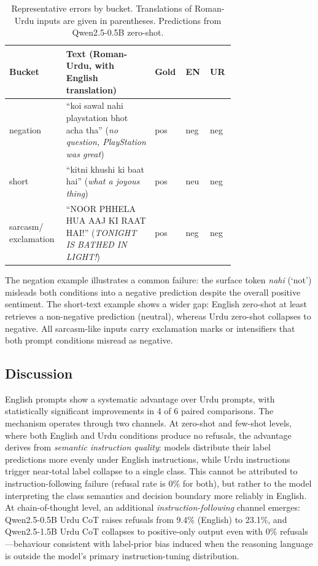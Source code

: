 \documentclass[conference]{IEEEtran}
\begin{document}
\begin{table}[t]
\centering
\caption{Representative errors by bucket. Translations of Roman-Urdu
inputs are given in parentheses. Predictions from Qwen2.5-0.5B zero-shot.}
\label{tab:qual}
\footnotesize
\begin{tabular}{p{0.16\linewidth}p{0.36\linewidth}p{0.07\linewidth}p{0.07\linewidth}p{0.07\linewidth}}
\toprule
Bucket & Text (Roman-Urdu, with English translation) & Gold & EN & UR \\
\midrule
negation &
  ``koi sawal nahi playstation bhot acha tha''
  ({\itshape no question, PlayStation was great}) &
  pos & neg & neg \\[4pt]
short &
  ``kitni khushi ki baat hai''
  ({\itshape what a joyous thing}) &
  pos & neu & neg \\[4pt]
sarcasm/ exclamation &
  ``NOOR PHHELA HUA AAJ KI RAAT HAI!''
  ({\itshape TONIGHT IS BATHED IN LIGHT!}) &
  pos & neg & neg \\
\bottomrule
\end{tabular}
\end{table}

The negation example illustrates a common failure: the surface token
\textit{nahi} (`not') misleads both conditions into a negative prediction
despite the overall positive sentiment. The short-text example shows a
wider gap: English zero-shot at least retrieves a non-negative prediction
(neutral), whereas Urdu zero-shot collapses to negative. All sarcasm-like
inputs carry exclamation marks or intensifiers that both prompt conditions
misread as negative.

\subsection{Discussion}
English prompts show a systematic advantage over Urdu prompts, with
statistically significant improvements in 4 of 6 paired comparisons.
The mechanism operates through two channels. At zero-shot and few-shot
levels, where both English and Urdu conditions produce no refusals, the
advantage derives from \emph{semantic instruction quality}: models
distribute their label predictions more evenly under English instructions,
while Urdu instructions trigger near-total label collapse to a single
class. This cannot be attributed to instruction-following failure
(refusal rate is 0\% for both), but rather to the model interpreting the
class semantics and decision boundary more reliably in English. At
chain-of-thought level, an additional \emph{instruction-following} channel
emerges: Qwen2.5-0.5B Urdu CoT raises refusals from 9.4\% (English) to
23.1\%, and Qwen2.5-1.5B Urdu CoT collapses to positive-only output even
with 0\% refusals---behaviour consistent with label-prior bias
\cite{zhao2021calibrate} induced when the reasoning language is outside
the model's primary instruction-tuning distribution.
\end{document}

